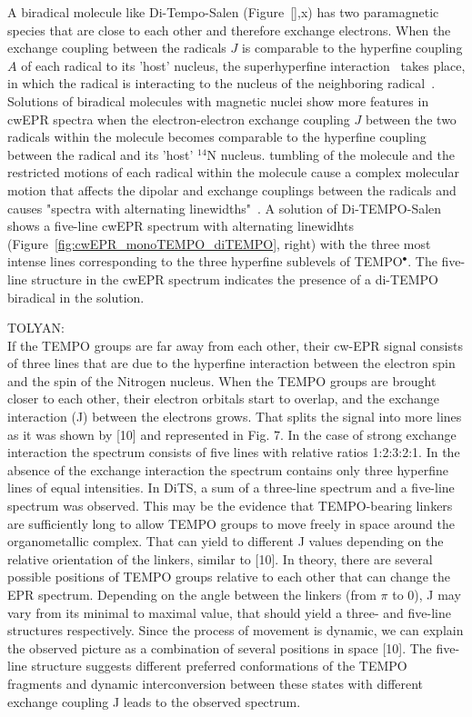 \par
A biradical molecule like Di-Tempo-Salen (Figure~\ref{},x) has two paramagnetic species that are close to each other and therefore exchange electrons. When the exchange coupling between the radicals $J$ is comparable to the hyperfine coupling $A$ of each radical to its 'host' nucleus, the superhyperfine interaction~\cite{} takes place, in which the radical is interacting to the nucleus of the neighboring radical~\cite{Eaton2018}. Solutions of biradical molecules with magnetic nuclei show more features in cwEPR spectra when the electron-electron exchange coupling $J$ between the two radicals within the molecule becomes comparable to the hyperfine coupling between the radical and its 'host' $^{14}$N nucleus. tumbling of the molecule and the restricted motions of each radical within the molecule cause a complex molecular motion that affects the dipolar and exchange couplings between the radicals and causes "spectra with alternating linewidths"~\cite{Eaton2018,carrington}. A solution of Di-TEMPO-Salen shows a five-line cwEPR spectrum with alternating linewidhts (Figure~\ref{fig:cwEPR_monoTEMPO_diTEMPO}, right) with the three most intense lines corresponding to the three hyperfine sublevels of TEMPO$^{\bullet}$. The five-line structure in the cwEPR spectrum indicates the presence of a di-TEMPO biradical in the solution.




\par
TOLYAN:\\
If the TEMPO groups are far away from each other, their cw-EPR signal consists of three
lines that are due to the hyperfine interaction between the electron spin and the spin of the Nitrogen
nucleus. When the TEMPO groups are brought closer to each other, their electron orbitals start to
overlap, and the exchange interaction (J) between the electrons grows. That splits the signal into
more lines as it was shown by [10] and represented in Fig. 7. In the case of strong exchange
interaction the spectrum consists of five lines with relative ratios 1:2:3:2:1. In the absence of the
exchange interaction the spectrum contains only three hyperfine lines of equal intensities.
In DiTS, a sum of a three-line spectrum and a five-line spectrum was observed. This may
be the evidence that TEMPO-bearing linkers are sufficiently long to allow TEMPO groups to move
freely in space around the organometallic complex. That can yield to different J values depending
on the relative orientation of the linkers, similar to [10]. In theory, there are several possible
positions of TEMPO groups relative to each other that can change the EPR spectrum. Depending
on the angle between the linkers (from $\pi$ to 0), J may vary from its minimal to maximal value,
that should yield a three- and five-line structures respectively. Since the process of movement is
dynamic, we can explain the observed picture as a combination of several positions in space [10].
The five-line structure suggests different preferred conformations of the TEMPO fragments and
dynamic interconversion between these states with different exchange coupling J leads to the
observed spectrum.

